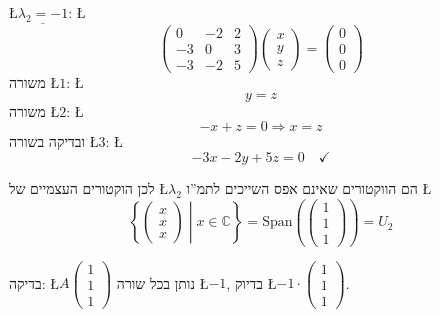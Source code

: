 \documentclass[english,hebrew]{article}
\begin{document}
\L{$\underline{\lambda_{2}=-1}$}: \L{%
\[
\begin{pmatrix}0 & -2 & 2\\
-3 & 0 & 3\\
-3 & -2 & 5
\end{pmatrix}\begin{pmatrix}x\\
y\\
z
\end{pmatrix}=\begin{pmatrix}0\\
0\\
0
\end{pmatrix}
\]
}%
משורה \L{$1$}: \L{%
\[
y=z
\]
}%
משורה \L{$2$}: \L{%
\[
-x+z=0\Longrightarrow x=z
\]
}%
ובדיקה בשורה \L{$3$}: \L{%
\[
-3x-2y+5z=0\quad\checkmark
\]
}%

לכן הוקטורים העצמיים של \L{$\lambda_{2}$} הם הווקטורים שאינם אפס
השייכים לתמ\textquotedblright ו \L{%
\[
\left\{ \begin{pmatrix}x\\
x\\
x
\end{pmatrix}\middle|x\in\mathbb{C}\right\} =\text{Span}\left(\begin{pmatrix}1\\
1\\
1
\end{pmatrix}\right)=U_{2}
\]
}%

בדיקה: \L{$A\begin{pmatrix}1\\
1\\
1
\end{pmatrix}$} נותן בכל שורה \L{$-1$}, בדיוק \L{$-1\cdot\begin{pmatrix}1\\
1\\
1
\end{pmatrix}$}.
\end{document}
